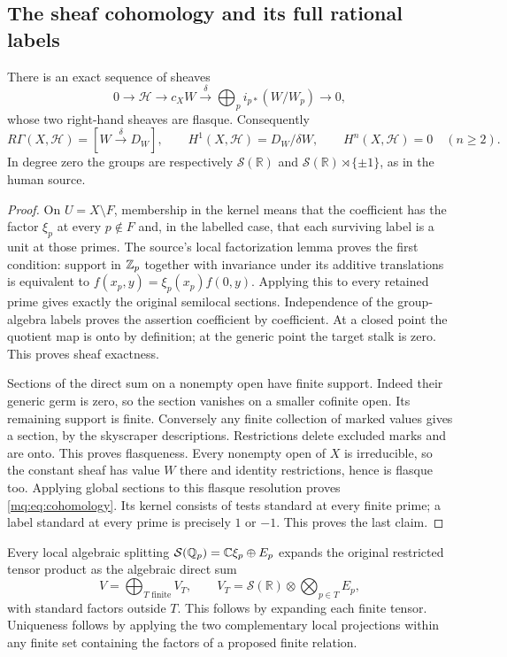 \subsection{The sheaf cohomology and its full rational labels}

\begin{theorem}
\label{mq:thm:resolution}
There is an exact sequence of sheaves
\[
 0\longrightarrow\mathcal H\longrightarrow c_XW
 \xrightarrow{\delta}\bigoplus_p i_{p*}(W/W_p)
 \longrightarrow0,
 \tag{MQ3}\label{mq:eq:resolution}
\]
whose two right-hand sheaves are flasque. Consequently
\[
 R\Gamma(X,\mathcal H)=[W\xrightarrow{\delta}D_W],
 \qquad H^1(X,\mathcal H)=D_W/\delta W,
 \qquad H^n(X,\mathcal H)=0\quad(n\ge2).
 \tag{MQ4}\label{mq:eq:cohomology}
\]
In degree zero the groups are respectively $\mathcal S(\mathbb R)$ and
$\mathcal S(\mathbb R)\rtimes\{\pm1\}$, as in the human source.
\end{theorem}
\begin{proof}
On $U=X\setminus F$, membership in the kernel means that the
coefficient has the factor $\xi_p$ at every $p\notin F$ and,
in the labelled case, that each surviving label is a unit at those
primes. The source's local factorization lemma proves the first
condition: support in $\mathbb Z_p$ together with invariance under its
additive translations is equivalent to
$f(x_p,y)=\xi_p(x_p)f(0,y)$. Applying this to every retained prime
gives exactly the original semilocal sections. Independence of the
group-algebra labels proves the assertion coefficient by coefficient.
At a closed point the quotient map is onto by definition; at the
generic point the target stalk is zero. This proves sheaf exactness.

Sections of the direct sum on a nonempty open have finite support.
Indeed their generic germ is zero, so the section vanishes on a
smaller cofinite open. Its remaining support is finite. Conversely
any finite collection of marked values gives a section, by the
skyscraper descriptions. Restrictions delete excluded marks and
are onto. This proves flasqueness. Every nonempty open of $X$ is
irreducible, so the constant sheaf has value $W$ there and identity
restrictions, hence is flasque too. Applying global sections to
this flasque resolution proves \eqref{mq:eq:cohomology}. Its kernel
consists of tests standard at every finite prime; a label standard
at every prime is precisely $1$ or $-1$. This proves the last claim.
\end{proof}

Every local algebraic splitting
$\mathcal S(\mathbb Q_p)=\mathbb C\xi_p\oplus E_p$ expands the original restricted
tensor product as the algebraic direct sum
\[
 V=\bigoplus_{T\text{ finite}}V_T,\qquad
 V_T=\mathcal S(\mathbb R)\otimes\bigotimes_{p\in T}E_p,
 \tag{MQ5}\label{mq:eq:algebraic-channels}
\]
with standard factors outside $T$. This follows by expanding each
finite tensor. Uniqueness follows by applying the two complementary
local projections within any finite set containing the factors of
a proposed finite relation.


